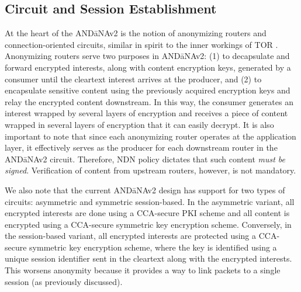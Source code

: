 \subsection{Circuit and Session Establishment}
At the heart of the {\sf AND\=aNAv2} is the notion of anonymizing routers and connection-oriented circuits, similar in spirit to the inner workings of TOR \cite{Tor}. Anonymizing routers serve two purposes in {\sf AND\=aNAv2}: (1) to decapsulate and forward encrypted interests, along with content encryption keys, generated by a consumer until the cleartext interest arrives at the producer, and (2) to encapsulate sensitive content using the previously acquired encryption keys and relay the encrypted content downstream. In this way, the consumer generates an interest wrapped by several layers of encryption and receives a piece of content wrapped in several layers of encryption that it can easily decrypt. It is also important to note that since each anonymizing router operates at the application layer, it effectively serves as the producer for each downstream router in the {\sf AND\=aNAv2} circuit. Therefore, NDN policy dictates that such content \emph{must be signed}. Verification of content from upstream routers, however, is not mandatory. 

We also note that the current {\sf AND\=aNAv2} design has support for two types of circuits: asymmetric and symmetric session-based. In the asymmetric variant, all encrypted interests are done using a CCA-secure PKI scheme and all content is encrypted using a CCA-secure symmetric key encryption scheme. Conversely, in the session-based variant, all encrypted interests are protected using a CCA-secure symmetric key encryption scheme, where the key is identified using a unique session identifier sent in the cleartext along with the encrypted interests. This worsens anonymity because it provides a way to link packets to a single session (as previously discussed).

